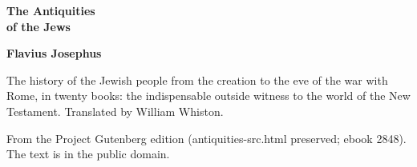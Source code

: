 \documentclass[11pt,letterpaper]{article}
\begin{document}
\color{ink}

\begin{titlepage}
\centering
\vspace*{4em}
{\LARGE\bfseries\color{heading} The Antiquities\\[0.3em]of the Jews\par}
\vspace{2em}
{\Large\bfseries\color{heading} Flavius Josephus\par}
\vspace{2.5em}
{\itshape\color{subhead}\parbox{0.8\linewidth}{\centering The history of the Jewish people from the creation to the eve of the war with Rome, in twenty books: the indispensable outside witness to the world of the New Testament. Translated by William Whiston.\par}}
\vfill
{\small From the Project Gutenberg edition (antiquities-src.html preserved; ebook 2848). The text is in the public domain.\par}
\vspace{2em}
\end{titlepage}

\tableofcontents


\end{document}
